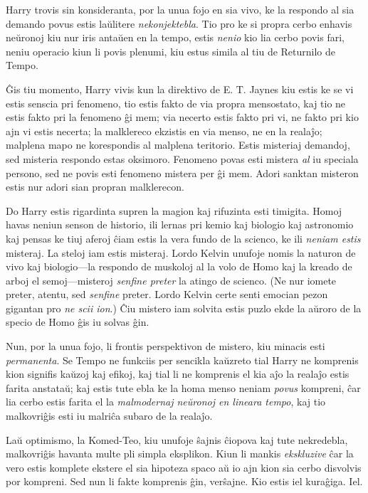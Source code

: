 Harry trovis sin konsideranta, por la unua fojo en sia vivo, ke la
respondo al sia demando povus estis laŭlitere
\emph{nekonjektebla}. Tio pro ke si propra cerbo enhavis neŭronoj kiu
nur iris antaŭen en la tempo, estis \emph{nenio} kio lia cerbo povis
fari, neniu operacio kiun li povis plenumi, kiu estus simila al tiu de
Returnilo de Tempo.

Ĝis tiu momento, Harry vivis kun la direktivo de E. T. Jaynes kiu
estis ke se vi estis senscia pri fenomeno, tio estis fakto de via
propra mensostato, kaj tio ne estis fakto pri la fenomeno ĝi mem; via
necerto estis fakto pri vi, ne fakto pri kio ajn vi estis necerta; la
malklereco ekzistis en via menso, ne en la realaĵo; malplena mapo ne
korespondis al malplena teritorio. Estis misteriaj demandoj, sed
misteria respondo estas oksimoro. Fenomeno povas esti mistera
\emph{al} iu speciala persono, sed ne povis esti fenomeno mistera per
ĝi mem. Adori sanktan misteron estis nur adori sian propran malklerecon.

Do Harry estis rigardinta supren la magion kaj rifuzinta esti
timigita. Homoj havas neniun senson de historio, ili lernas pri kemio
kaj biologio kaj astronomio kaj pensas ke tiuj aferoj ĉiam estis la
vera fundo de la scienco, ke ili \emph{neniam estis} misteraj. La
steloj iam estis misteraj. Lordo Kelvin unufoje nomis la naturon de
vivo kaj biologio—la respondo de muskoloj al la volo de Homo kaj la
kreado de arboj el semoj—misteroj \emph{senfine preter} la atingo de
scienco. (Ne nur iomete preter, atentu, sed \emph{senfine}
preter. Lordo Kelvin certe senti emocian pezon gigantan pro \emph{ne
scii ion}.) Ĉiu mistero iam solvita estis puzlo ekde la aŭroro de la
specio de Homo ĝis iu solvas ĝin. 

Nun, por la unua fojo, li frontis perspektivon de mistero, kiu minacis
esti \emph{permanenta}. Se Tempo ne funkciis per sencikla kaŭzreto
tial Harry ne komprenis kion signifis kaŭzoj kaj efikoj, kaj tial li
ne komprenis el kia aĵo la realaĵo estis farita anstataŭ; kaj estis
tute ebla ke la homa menso neniam \emph{povus} kompreni, ĉar lia cerbo
estis farita el la \emph{malmodernaj neŭronoj en lineara tempo}, kaj
tio malkovriĝis esti iu malriĉa subaro de la realaĵo.

Laŭ optimismo, la Komed-Teo, kiu unufoje ŝajnis ĉiopova kaj tute
nekredebla, malkovriĝis havanta multe pli simpla eksplikon. Kiun li
mankis \emph{ekskluzive} ĉar la vero estis komplete ekstere el sia
hipoteza spaco aŭ io ajn kion sia cerbo disvolvis por kompreni. Sed
nun li fakte komprenis ĝin, verŝajne. Kio estis iel kuraĝiga. Iel.

